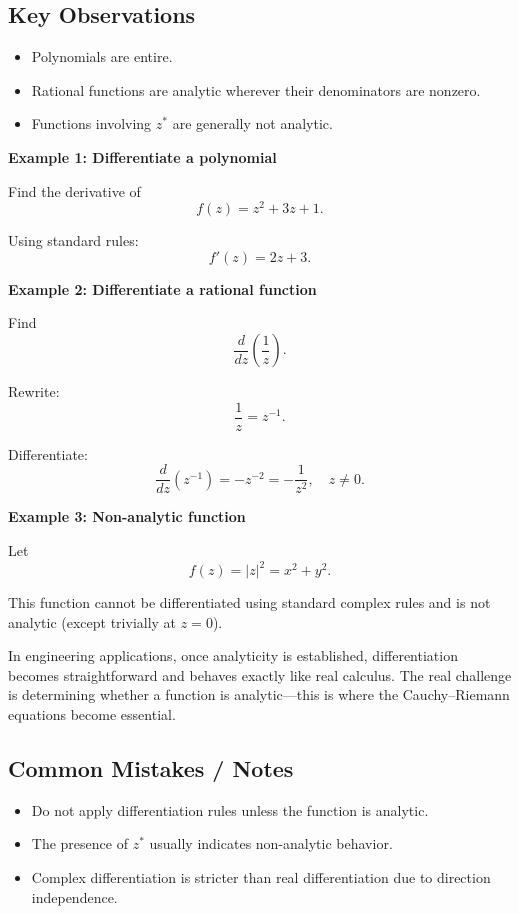 \subsection*{Key Observations}

\begin{itemize}
    \item Polynomials are entire.
    \item Rational functions are analytic wherever their denominators are nonzero.
    \item Functions involving $z^*$ are generally not analytic.
\end{itemize}

\begin{examplebox}
    \textbf{Example 1: Differentiate a polynomial}

    Find the derivative of
    \[
        f(z)=z^2+3z+1.
    \]

    Using standard rules:
    \[
        f'(z)=2z+3.
    \]
\end{examplebox}

\begin{examplebox}
    \textbf{Example 2: Differentiate a rational function}

    Find
    \[
        \frac{d}{dz}\left(\frac{1}{z}\right).
    \]

    Rewrite:
    \[
        \frac{1}{z}=z^{-1}.
    \]

    Differentiate:
    \[
        \frac{d}{dz}(z^{-1})=-z^{-2}=-\frac{1}{z^2}, \quad z\neq 0.
    \]
\end{examplebox}

\begin{examplebox}
    \textbf{Example 3: Non-analytic function}

    Let
    \[
        f(z)=|z|^2=x^2+y^2.
    \]

    This function cannot be differentiated using standard complex rules and is not analytic (except trivially at $z=0$).
\end{examplebox}

\begin{noteBox}
    In engineering applications, once analyticity is established, differentiation becomes straightforward and behaves exactly like real calculus. The real challenge is determining whether a function is analytic—this is where the Cauchy--Riemann equations become essential.
\end{noteBox}

\subsection*{Common Mistakes / Notes}

\begin{itemize}
    \item Do not apply differentiation rules unless the function is analytic.
    \item The presence of $z^*$ usually indicates non-analytic behavior.
    \item Complex differentiation is stricter than real differentiation due to direction independence.
\end{itemize}
